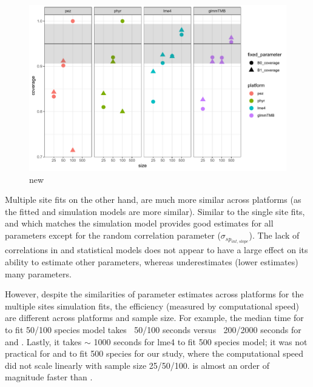 \documentclass[12pt]{article}
\begin{document}
\begin{center}
\begin{figure}[h]
  \includegraphics[scale=0.8,page=1]{./figure/mscoverage.pdf}
  \caption{new}
\end{figure}
\end{center}


Multiple site fits on the other hand, are much more similar across platforms (as the fitted and simulation models are more similar).
Similar to the single site fits,  and  which matches the simulation model provides good estimates for all parameters except for the random correlation parameter ($\sigma_{sp_{int,slope}}$).
The lack of correlations in  and  statistical models does not appear to have a large effect on its ability to estimate other parameters, whereas  underestimates (lower estimates) many parameters.  

However, despite the similarities of parameter estimates across platforms for the multiple sites simulation fits, the efficiency (measured by computational speed) are different across platforms and sample size.
For example, the median time for  to fit 50/100 species model takes $~$ 50/100 seconds versus $~$ 200/2000 seconds for  and . 
Lastly, it takes $\sim$ 1000 seconds for lme4 to fit 500 species model; it was not practical for  and  to fit 500 species for our study, where the computational speed did not scale linearly with sample size 25/50/100.
 is almost an order of magnitude faster than .
\end{document}

